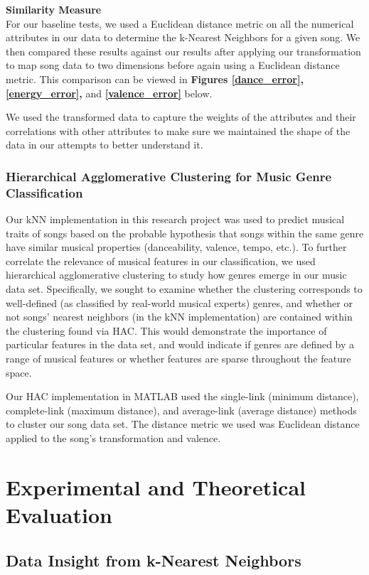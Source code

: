 \documentclass{article}
\begin{document}
\textbf{Similarity Measure}\\
For our baseline tests, we used a Euclidean distance metric on all the numerical
attributes in our data to determine the k-Nearest Neighbors for a given song. We
then compared these results against our results after applying our transformation
to map song data to two dimensions before again using a Euclidean distance metric.
This comparison can be viewed in \textbf{Figures \ref{dance_error}, \ref{energy_error},} and
\textbf{\ref{valence_error}} below.

We used the transformed data to capture the weights of the attributes and their
correlations with other attributes to make sure we maintained the shape of the
data in our attempts to better understand it.

\subsubsection{Hierarchical Agglomerative Clustering for Music Genre Classification}
Our kNN implementation in this research project was used to predict musical
traits of songs based on the probable hypothesis that songs within the same
genre have similar musical properties (danceability, valence, tempo, etc.). To
further correlate the relevance of musical features in our classification, we
used hierarchical agglomerative clustering to study how genres emerge in our
music data set. Specifically, we sought to examine whether the clustering
corresponds to well-defined (as classified by real-world musical experts)
genres, and whether or not songs' nearest neighbors (in the kNN implementation)
are contained within the clustering found via HAC. This would demonstrate the
importance of particular features in the data set, and would indicate if genres
are defined by a range of musical features or whether features are sparse
throughout the feature space.

Our HAC implementation in MATLAB used the single-link (minimum distance),
complete-link (maximum distance), and average-link (average distance) methods to
cluster our song data set. The distance metric we used was Euclidean distance
applied to the song's transformation and valence.

\section{Experimental and Theoretical Evaluation}
\subsection{Data Insight from k-Nearest Neighbors}
\end{document}
